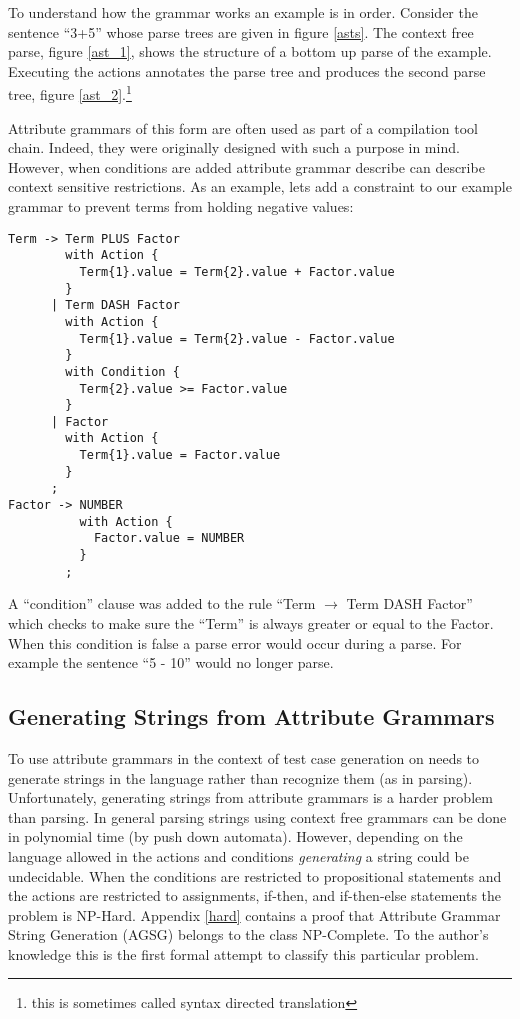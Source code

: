 To understand how the grammar works an example is in order. Consider the
sentence ``3+5'' whose parse trees are given in figure \ref{asts}. The context
free parse, figure \ref{ast_1}, shows the structure of a bottom up parse of the
example. Executing the actions annotates the parse tree and produces the second
parse tree, figure \ref{ast_2}.\footnote{this is sometimes called syntax
directed translation} 

Attribute grammars of this form are often used as part of a compilation tool
chain. Indeed, they were originally designed with such a purpose in mind.
However, when conditions are added attribute grammar describe can describe
context sensitive restrictions.\cite{Slonneger1995} As an example, lets add a
constraint to our example grammar to prevent terms from holding negative values:

\begin{verbatim}
Term -> Term PLUS Factor
        with Action {
          Term{1}.value = Term{2}.value + Factor.value
        }
      | Term DASH Factor
        with Action {
          Term{1}.value = Term{2}.value - Factor.value
        }
        with Condition {
          Term{2}.value >= Factor.value
        }
      | Factor
        with Action {
          Term{1}.value = Factor.value
        }
      ;
Factor -> NUMBER 
          with Action {
            Factor.value = NUMBER
          }
        ;
\end{verbatim}

\noindent
A ``condition'' clause was added to the rule ``Term $\rightarrow$ Term DASH
Factor'' which checks to make sure the ``Term'' is always greater or equal to
the Factor. When this condition is false a parse error would occur during a
parse. For example the sentence ``5 - 10'' would no longer parse.

\subsection{Generating Strings from Attribute Grammars}

To use attribute grammars in the context of test case generation on needs to
generate strings in the language rather than recognize them (as in parsing).
Unfortunately, generating strings from attribute grammars is a harder problem
than parsing. In general parsing strings using context free grammars can be done
in polynomial time (by push down automata).\cite{Aho2007} However, depending on
the language allowed in the actions and conditions \textit{generating} a string
could be undecidable. When the conditions are restricted to propositional
statements and the actions are restricted to assignments, if-then, and
if-then-else statements the problem is NP-Hard. Appendix \ref{hard} contains a
proof that Attribute Grammar String Generation (AGSG) belongs to the class
NP-Complete. To the author's knowledge this is the first formal attempt to
classify this particular problem.

